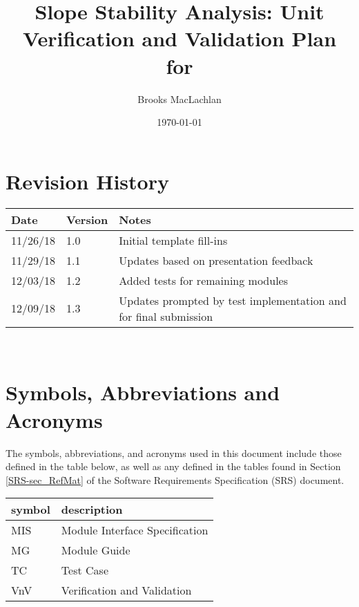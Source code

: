 \documentclass[12pt, titlepage]{article}
\begin{document}
\title{Slope Stability Analysis: Unit Verification and Validation Plan for 
\progname{}} 
\author{Brooks MacLachlan}
\date{\today}
	
\maketitle


\section{Revision History}

\begin{tabularx}{\textwidth}{p{3cm}p{2cm}X}
\toprule {\bf Date} & {\bf Version} & {\bf Notes}\\
\midrule
11/26/18 & 1.0 & Initial template fill-ins\\
11/29/18 & 1.1 & Updates based on presentation feedback\\
12/03/18 & 1.2 & Added tests for remaining modules\\
12/09/18 & 1.3 & Updates prompted by test implementation and for final 
submission\\
\bottomrule
\end{tabularx}

~\newpage

\tableofcontents

\listoftables

\newpage

\section{Symbols, Abbreviations and Acronyms}

The symbols, abbreviations, and acronyms used in this document include those 
defined in the table below, as well as any defined in the tables found in 
Section \ref{SRS-sec_RefMat} of the Software Requirements Specification (SRS) 
document.
\newline

\renewcommand{\arraystretch}{1.2}
\begin{tabular}{l l} 
	\toprule		
	\textbf{symbol} & \textbf{description}\\
	\midrule
	MIS & Module Interface Specification\\
	MG & Module Guide\\
	TC & Test Case\\
	VnV & Verification and Validation\\
	\bottomrule
\end{tabular}\\
\end{document}
